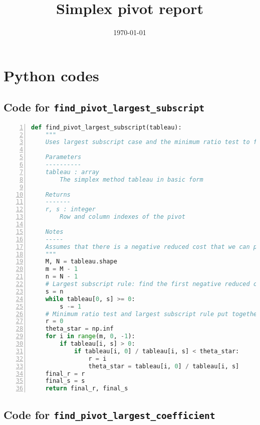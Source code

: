 \documentclass[a4paper]{article}
\title{Simplex pivot report}
\date{\today}
\numberwithin{equation}{section}
\begin{document}
\maketitle


\section{Python codes}
\label{sec:code}

\subsection{Code for \texttt{find\_pivot\_largest\_subscript}}
\label{sec:code_ls}


\begin{lstlisting}[language=Python,numbers=left,numbersep=5pt, breaklines=true]
  def find_pivot_largest_subscript(tableau):
    """
    Uses largest subscript case and the minimum ratio test to find the pivot entry in the tableau.

    Parameters
    ----------
    tableau : array
        The simplex method tableau in basic form

    Returns
    -------
    r, s : integer
        Row and column indexes of the pivot
        
    Notes
    -----
    Assumes that there is a negative reduced cost that we can pivot on.
    """
    M, N = tableau.shape
    m = M - 1
    n = N - 1
    # Largest subscript rule: find the first negative reduced cost from the right of the tableau
    s = n
    while tableau[0, s] >= 0:
        s -= 1
    # Minimum ratio test and largest subscript rule put together:
    r = 0
    theta_star = np.inf
    for i in range(m, 0, -1):
        if tableau[i, s] > 0:
            if tableau[i, 0] / tableau[i, s] < theta_star:
                r = i
                theta_star = tableau[i, 0] / tableau[i, s]
    final_r = r
    final_s = s
    return final_r, final_s
\end{lstlisting}
  

\subsection{Code for \texttt{find\_pivot\_largest\_coefficient}}
\label{sec:code_lc}
\end{document}
